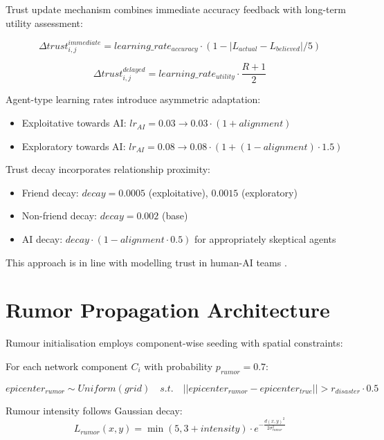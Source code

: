 \documentclass[pdflatex,sn-apa]{sn-jnl}%
\begin{document}
\begin{appendices}
Trust update mechanism combines immediate accuracy feedback with long-term utility assessment:

\begin{equation}
\Delta trust_{i,j}^{immediate} = learning\_rate_{accuracy} \cdot (1 - |L_{actual} - L_{believed}|/5)
\end{equation}

\begin{equation}
\Delta trust_{i,j}^{delayed} = learning\_rate_{utility} \cdot \frac{R + 1}{2}
\end{equation}

Agent-type learning rates introduce asymmetric adaptation:
\begin{itemize}
   \item Exploitative towards AI: $lr_{AI} = 0.03 \rightarrow 0.03 \cdot (1 + alignment)$
   \item Exploratory towards AI: $lr_{AI} = 0.08 \rightarrow 0.08 \cdot (1 + (1-alignment) \cdot 1.5)$
\end{itemize}

Trust decay incorporates relationship proximity:
\begin{itemize}
   \item Friend decay: $decay = 0.0005$ (exploitative), $0.0015$ (exploratory)
   \item Non-friend decay: $decay = 0.002$ (base)
   \item AI decay: $decay \cdot (1 - alignment \cdot 0.5)$ for appropriately skeptical agents
\end{itemize}

This approach is in line with modelling trust in human-AI teams \citep{lee2004trust,gambetta2005streetwise}.

\section{Rumor Propagation Architecture}

Rumour initialisation employs component-wise seeding with spatial constraints:

For each network component $C_i$ with probability $p_{rumor} = 0.7$:

\begin{equation}
epicenter_{rumor} \sim Uniform(grid) \quad s.t. \quad ||epicenter_{rumor} - epicenter_{true}|| > r_{disaster} \cdot 0.5
\end{equation}

Rumour intensity follows Gaussian decay:
\begin{equation}
L_{rumor}(x,y) = \min(5, 3 + intensity) \cdot e^{-\frac{d(x,y)^2}{2\sigma_{rumor}^2}}
\end{equation}


\end{appendices}
\end{document}
